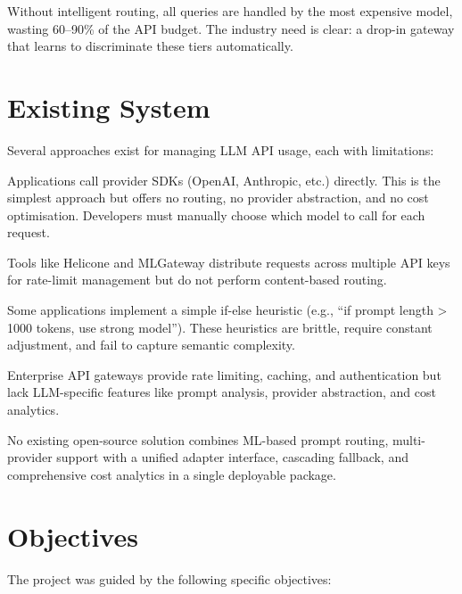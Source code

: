 \documentclass[12pt,a4paper]{report}
\begin{document}
Without intelligent routing, all queries are handled by the most expensive model, wasting 60--90\% of the API budget. The industry need is clear: a drop-in gateway that learns to discriminate these tiers automatically.

\section{Existing System}

Several approaches exist for managing LLM API usage, each with limitations:

\begin{description}[nosep]
    \item[Direct SDK Integration:] Applications call provider SDKs (OpenAI, Anthropic, etc.) directly. This is the simplest approach but offers no routing, no provider abstraction, and no cost optimisation. Developers must manually choose which model to call for each request.
    \item[API Key Rotation / Load Balancing:] Tools like Helicone and MLGateway distribute requests across multiple API keys for rate-limit management but do not perform content-based routing.
    \item[Manual Tier Selection:] Some applications implement a simple if-else heuristic (e.g., ``if prompt length > 1000 tokens, use strong model''). These heuristics are brittle, require constant adjustment, and fail to capture semantic complexity.
    \item[Managed Gateways (Azure API Management, Kong):] Enterprise API gateways provide rate limiting, caching, and authentication but lack LLM-specific features like prompt analysis, provider abstraction, and cost analytics.
\end{description}

No existing open-source solution combines ML-based prompt routing, multi-provider support with a unified adapter interface, cascading fallback, and comprehensive cost analytics in a single deployable package.

\section{Objectives}

The project was guided by the following specific objectives:
\end{document}
